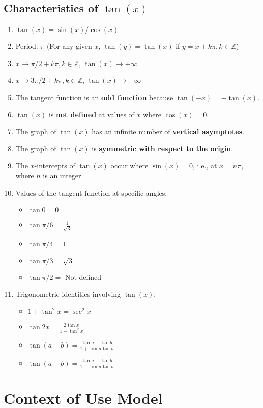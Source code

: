 \documentclass[11pt,a4paper,twoside]{article}
\begin{document}
\subsection{Characteristics of $\tan(x)$}
\begin{enumerate}
\item $\tan(x)=\sin(x)/\cos(x)$
\item Period: $\pi$ (For any given $x$, $\tan(y)=\tan(x)$ if $y = x + k\pi, k \in \mathbb{Z}$)
\item $x\rightarrow \pi /2+k\pi, k\in \mathbb{Z}$, $\tan(x)\rightarrow+\infty$
\item $x\rightarrow3\pi/2+k\pi, k\in \mathbb{Z}$, $\tan(x)\rightarrow-\infty$
\item The tangent function is an \textbf{odd function} because $\tan(-x) = -\tan(x)$.
\item $\tan(x)$ is \textbf{not defined} at values of $x$ where $\cos(x) = 0$.
\item The graph of $\tan(x)$ has an infinite number of \textbf{vertical asymptotes}.
\item The graph of $\tan(x)$ is \textbf{symmetric with respect to the origin}.
\item The $x$-intercepts of $\tan(x)$ occur where $\sin(x) = 0$, i.e., at $x = n\pi$, where $n$ is an integer.
\item Values of the tangent function at specific angles:
  \begin{itemize}
  \item $\tan 0 = 0$
  \item $\tan \pi/6 = \frac{1}{\sqrt{3}}$
  \item $\tan \pi/4 = 1$
  \item $\tan \pi/3 = \sqrt{3}$
  \item $\tan \pi/2 = $ Not defined
  \end{itemize}
\item Trigonometric identities involving $\tan(x)$:
  \begin{itemize}
  \item $1 + \tan^2x = \sec^2x$
  \item $\tan 2x = \frac{2\tan x}{1 - \tan^2x}$
  \item $\tan(a-b) = \frac{\tan a - \tan b}{1 + \tan a \tan b}$
  \item $\tan(a+b) = \frac{\tan a + \tan b}{1 - \tan a \tan b}$
  \end{itemize}
\end{enumerate}

\section{Context of Use Model}
\end{document}
